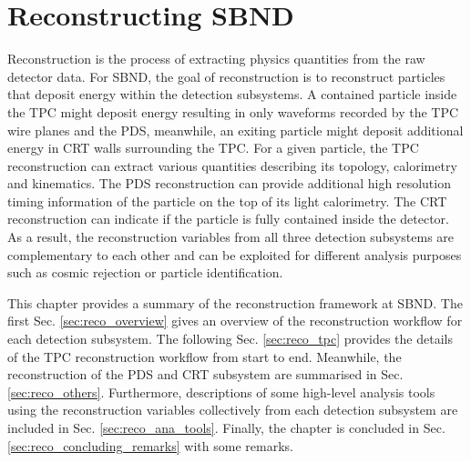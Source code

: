 
\chapter{Reconstructing SBND}
\label{ChapterReco}

\ifpdf
    \graphicspath{{Chapter7/Figs/Raster/}{Chapter7/Figs/PDF/}{Chapter7/Figs/}}
\else
    \graphicspath{{Chapter7/Figs/Vector/}{Chapter7/Figs/}}
\fi


Reconstruction is the process of extracting physics quantities from the raw detector data.
For SBND, the goal of reconstruction is to reconstruct particles that deposit energy within the detection subsystems.
A contained particle inside the TPC might deposit energy resulting in only waveforms recorded by the TPC wire planes and the PDS, meanwhile, an exiting particle might deposit additional energy in CRT walls surrounding the TPC.
For a given particle, the TPC reconstruction can extract various quantities describing its topology, calorimetry and kinematics.
The PDS reconstruction can provide additional high resolution timing information of the particle on the top of its light calorimetry.
The CRT reconstruction can indicate if the particle is fully contained inside the detector.
As a result, the reconstruction variables from all three detection subsystems are complementary to each other and can be exploited for different analysis purposes such as cosmic rejection or particle identification.

This chapter provides a summary of the reconstruction framework at SBND.
The first Sec. \ref{sec:reco_overview} gives an overview of the reconstruction workflow for each detection subsystem. 
The following Sec. \ref{sec:reco_tpc} provides the details of the TPC reconstruction workflow from start to end.
Meanwhile, the reconstruction of the PDS and CRT subsystem are summarised in Sec. \ref{sec:reco_others}.
Furthermore, descriptions of some high-level analysis tools using the reconstruction variables collectively from each detection subsystem are included in Sec. \ref{sec:reco_ana_tools}.                 
Finally, the chapter is concluded in Sec. \ref{sec:reco_concluding_remarks} with some remarks.

